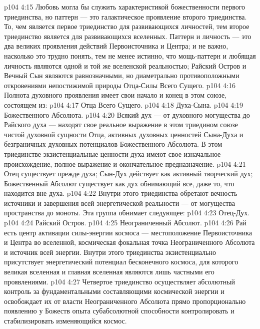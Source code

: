 \vs p104 4:15 Любовь могла бы служить характеристикой божественности первого триединства, но паттерн --- это галактическое проявление второго триединства. То, чем является первое триединство для развивающихся личностей, тем второе триединство является для развивающихся вселенных. Паттерн и личность --- это два великих проявления действий Первоисточника и Центра; и не важно, насколько это трудно понять, тем не менее истинно, что мощь\hyp{}паттерн и любящая личность являются одной и той же вселенской реальностью; Райский Остров и Вечный Сын являются равнозначными, но диаметрально противоположными откровениями непостижимой природы Отца\hyp{}Силы Всего Сущего.
\vs p104 4:16 \pc {} Полнота духовного проявления имеет свои начало и конец в этом союзе, состоящем из:
\vs p104 4:17 \bibnobreakspace Отца Всего Сущего.
\vs p104 4:18 \bibnobreakspace Духа\hyp{}Сына.
\vs p104 4:19 \bibnobreakspace Божественного Абсолюта.
\vs p104 4:20 \pc Всякий дух --- от духовного могущества до Райского духа --- находят свое реальное выражение в этом триедином союзе чистой духовной сущности Отца, активных духовных ценностей Сына\hyp{}Духа и безграничных духовных потенциалов Божественного Абсолюта. В этом триединстве экзистенциальные ценности духа имеют свое изначальное происхождение, полное выражение и окончательное предназначение.
\vs p104 4:21 Отец существует прежде духа; Сын\hyp{}Дух действует как активный творческий дух; Божественный Абсолют существует как дух обнимающий все, даже то, что находится вне духа.
\vs p104 4:22 \pc {} Внутри этого триединства обретают вечность источники и завершения всей энергетической реальности --- от могущества пространства до моноты. Эта группа обнимает следующее:
\vs p104 4:23 \bibnobreakspace Отец\hyp{}Дух.
\vs p104 4:24 \bibnobreakspace Райский Остров.
\vs p104 4:25 \bibnobreakspace Неограниченный Абсолют.
\vs p104 4:26 \pc Рай есть центр активации силы\hyp{}энергии космоса --- местоположение Первоисточника и Центра во вселенной, космическая фокальная точка Неограниченного Абсолюта и источник всей энергии. Внутри этого триединства экзистенциально присутствует энергетический потенциал бесконечного космоса, для которого великая вселенная и главная вселенная являются лишь частными его проявлениями.
\vs p104 4:27 Четвертое триединство осуществляет абсолютный контроль за фундаментальными составляющими космической энергии и освобождает их от власти Неограниченного Абсолюта прямо пропорционально появлению у Божеств опыта субабсолютной способности контролировать и стабилизировать изменяющийся космос.
